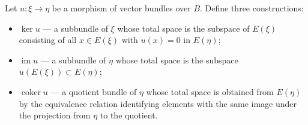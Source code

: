 Let $u: \xi \to \eta$ be a morphism of vector bundles over $B$. Define three constructions:

\begin{itemize}
\item $\ker u$ — a subbundle of $\xi$ whose total space is the subspace of $E(\xi)$ consisting of all $x \in E(\xi)$ with $u(x) = 0$ in $E(\eta)$;

\item $\operatorname{im} u$ — a subbundle of $\eta$ whose total space is the subspace $u(E(\xi)) \subset E(\eta)$;

\item $\operatorname{coker} u$ — a quotient bundle of $\eta$ whose total space is obtained from $E(\eta)$ by the equivalence relation identifying elements with the same image under the projection from $\eta$ to the quotient.
\end{itemize}
